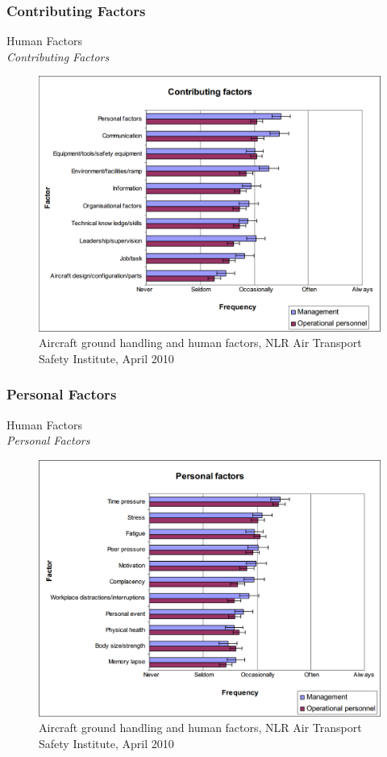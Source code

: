 \subsubsection{Contributing Factors}
\begin{frame}{Human Factors\\\textit{Contributing Factors}}{}
	\begin{figure}[H]
	\centering
	\includegraphics[width=\textwidth]{Grafik/ContributingFactors}
	\caption{\footnotesize Aircraft ground handling and human factors, NLR Air Transport Safety Institute, April 2010}
\end{figure}
\end{frame}

\subsubsection{Personal Factors}
\begin{frame}{Human Factors\\\textit{Personal Factors}}{}
	\begin{figure}[H]
	\centering
	\includegraphics[width=\textwidth]{Grafik/PersonalFactors}
	\caption{\footnotesize Aircraft ground handling and human factors, NLR Air Transport Safety Institute, April 2010}
\end{figure}
\end{frame}

